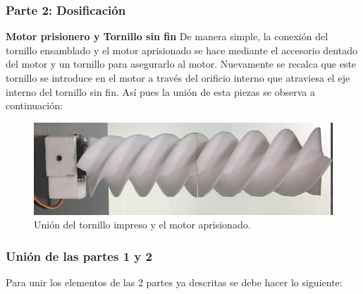 \subsubsection{Parte 2: Dosificación}

\item \textbf{Motor prisionero y Tornillo sin fin}
De manera simple, la conexión del tornillo ensamblado y el motor aprisionado se hace mediante  el accesorio dentado del motor y un tornillo para asegurarlo al motor. Nuevamente se recalca que este tornillo se introduce en el motor a través del orificio interno que atraviesa el  eje interno del tornillo sin fin. Así pues la unión de esta piezas se observa a continuación:

\begin{figure}[H]
    \begin{center}
    	\includegraphics[scale=0.65]{img/tornimotor2.png}
    \end{center}
    \caption{Unión del tornillo impreso y el motor aprisionado. \label{}}
\end{figure}

\subsubsection{Unión de las partes 1 y 2}

Para unir los elementos de las 2 partes ya descritas se debe hacer lo siguiente:

